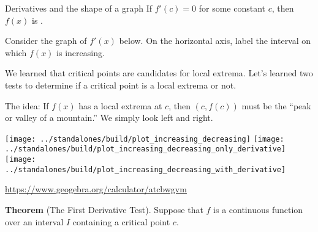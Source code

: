 \documentclass[../main.tex]{subfiles}
\begin{document}
\begin{lesson}{Derivatives and the shape of a graph}
  \faStar{} If \(f'(c) = 0\) for some constant \(c\), then \(f(x)\) is \underline{\hspace{3.5in}}.

  \begin{example}
    Consider the graph of \(f'(x)\) below. On the horizontal axis, label the interval on which \(f(x)\) is increasing. 

    \begin{center}
    \end{center}
  \end{example}

  We learned that critical points are candidates for local extrema. Let's learned two tests to determine if a critical point is a local extrema or not.

  The idea: If \(f(x)\) has a local extrema at \(c\), then \((c,f(c))\) must be the ``peak or valley of a mountain.''  We simply look left and right.
  \begin{center}
    \texttt{[image: ../standalones/build/plot\_increasing\_decreasing]}
    \hfill
    \texttt{[image: ../standalones/build/plot\_increasing\_decreasing\_only\_derivative]}
    \hfill
    \texttt{[image: ../standalones/build/plot\_increasing\_decreasing\_with\_derivative]}

    \url{https://www.geogebra.org/calculator/atcbwgvm}
  \end{center}
  \clearpage

  \begin{mdframed}[style=withref-compact]
    \textbf{Theorem} (The First Derivative Test). Suppose that \(f\) is a continuous function over an interval \(I\) containing a critical point \(c\). 


\end{mdframed}
\end{lesson}
\end{document}
